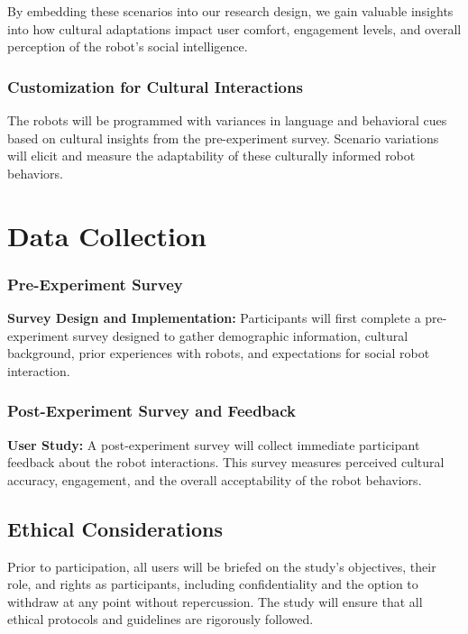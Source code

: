 By embedding these scenarios into our research design, we gain valuable insights into how cultural adaptations impact user comfort, engagement levels, and overall perception of the robot’s social intelligence.

\subsubsection{Customization for Cultural Interactions}

The robots will be programmed with variances in language and behavioral cues based on cultural insights from the pre-experiment survey. Scenario variations will elicit and measure the adaptability of these culturally informed robot behaviors.

\section{Data Collection}

\subsubsection{Pre-Experiment Survey}

\textbf{Survey Design and Implementation:} Participants will first complete a pre-experiment survey designed to gather demographic information, cultural background, prior experiences with robots, and expectations for social robot interaction.

\subsubsection{Post-Experiment Survey and Feedback}

\textbf{User Study:} A post-experiment survey will collect immediate participant feedback about the robot interactions. This survey measures perceived cultural accuracy, engagement, and the overall acceptability of the robot behaviors.

\subsection{Ethical Considerations}

Prior to participation, all users will be briefed on the study's objectives, their role, and rights as participants, including confidentiality and the option to withdraw at any point without repercussion. The study will ensure that all ethical protocols and guidelines are rigorously followed.

